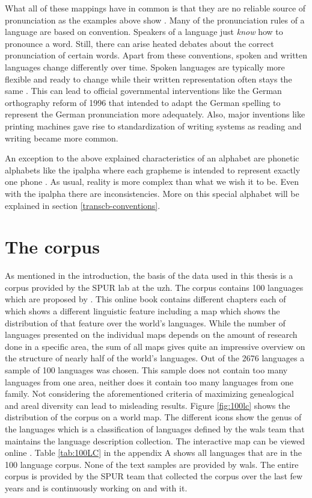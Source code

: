 What all of these mappings have in common is that they are no reliable source of pronunciation as the examples above show \citep{Intro.2007}. Many of the pronunciation rules of a language are based on convention. Speakers of a language just \textit{know} how to pronounce a word. Still, there can arise heated debates about the correct pronunciation of certain words.  Apart from these conventions, spoken and written languages change differently over time. Spoken languages are typically more flexible and ready to change while their written representation often stays the same \citep{unicode-lingu}. This can lead to official governmental interventions like the German orthography reform of 1996 that intended to adapt the German spelling to represent the German pronunciation more adequately. Also, major inventions like printing machines gave rise to standardization of writing systems as reading and writing became more common.

An exception to the above explained characteristics of an alphabet are phonetic alphabets like the \ac{ipalpha} where each grapheme is intended to represent exactly one phone  \citep{writing-systems, Intro.2007}. As usual, reality is more complex than what we wish it to be. Even with the \ac{ipalpha} there are inconsistencies. More on this special alphabet will be explained in section \ref{transcb-conventions}.


\section{The corpus}
\label{corpus}
As mentioned in the introduction, the basis of the data used in this thesis is a corpus provided by the SPUR lab at the \ac{uzh}. The corpus contains 100 languages which are proposed by \citet{Comrie&Dryer.2013}. This online book contains different chapters each of which shows a different linguistic feature including a map which shows the distribution of that feature over the world's languages. While the number of languages presented on the individual maps depends on the amount of research done in a specific area, the sum of all maps gives quite an impressive overview on the structure of nearly half of the world's languages. Out of the 2676 languages a sample of 100 languages was chosen. This sample does not contain too many languages from one area, neither does it contain too many languages from one family. Not considering the aforementioned criteria of maximizing genealogical and areal diversity can lead to misleading results. Figure \ref{fig:100lc} shows the distribution of the corpus on a world map. The different icons show the genus of the languages which is a classification of languages defined by the \ac{wals} team that maintains the language description collection. The interactive map can be viewed online \citep{100LC.21.07.2021}. Table \ref{tab:100LC} in the appendix A shows all languages that are in the 100 language corpus. None of the text samples are provided by \ac{wals}. The entire corpus is provided by the SPUR team that collected the corpus over the last few years and is continuously working on and with it.

